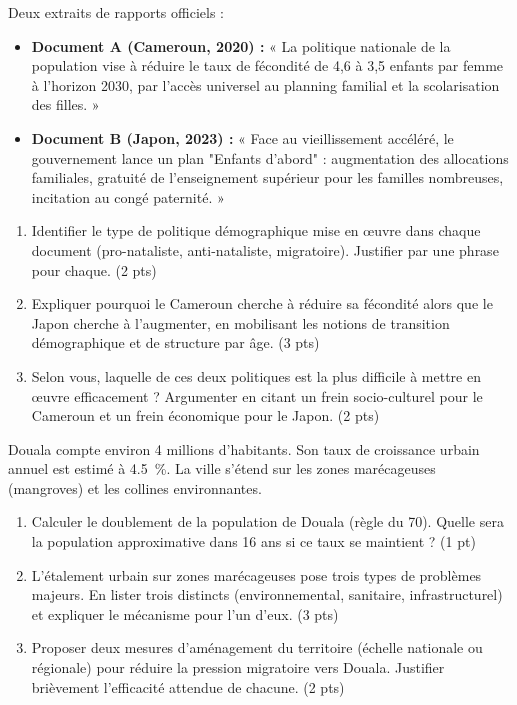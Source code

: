 \documentclass[11pt]{article}
\begin{document}
\begin{exercice}
Deux extraits de rapports officiels :

\begin{itemize}
    \item \textbf{Document A (Cameroun, 2020) :} « La politique nationale de la population vise à réduire le taux de fécondité de 4,6 à 3,5 enfants par femme à l'horizon 2030, par l'accès universel au planning familial et la scolarisation des filles. »
    \item \textbf{Document B (Japon, 2023) :} « Face au vieillissement accéléré, le gouvernement lance un plan "Enfants d'abord" : augmentation des allocations familiales, gratuité de l'enseignement supérieur pour les familles nombreuses, incitation au congé paternité. »
\end{itemize}

\begin{enumerate}
    \item Identifier le type de politique démographique mise en œuvre dans chaque document (pro-nataliste, anti-nataliste, migratoire). Justifier par une phrase pour chaque. (2 pts)
    \item Expliquer pourquoi le Cameroun cherche à réduire sa fécondité alors que le Japon cherche à l'augmenter, en mobilisant les notions de transition démographique et de structure par âge. (3 pts)
    \item Selon vous, laquelle de ces deux politiques est la plus difficile à mettre en œuvre efficacement ? Argumenter en citant un frein socio-culturel pour le Cameroun et un frein économique pour le Japon. (2 pts)
\end{enumerate}
\end{exercice}

\begin{exercice}
Douala compte environ 4 millions d'habitants. Son taux de croissance urbain annuel est estimé à \SI{4,5}{\percent}. La ville s'étend sur les zones marécageuses (mangroves) et les collines environnantes.

\begin{enumerate}
    \item Calculer le doublement de la population de Douala (règle du 70). Quelle sera la population approximative dans 16 ans si ce taux se maintient ? (1 pt)
    \item L'étalement urbain sur zones marécageuses pose trois types de problèmes majeurs. En lister trois distincts (environnemental, sanitaire, infrastructurel) et expliquer le mécanisme pour l'un d'eux. (3 pts)
    \item Proposer deux mesures d'aménagement du territoire (échelle nationale ou régionale) pour réduire la pression migratoire vers Douala. Justifier brièvement l'efficacité attendue de chacune. (2 pts)
\end{enumerate}
\end{exercice}
\end{document}
